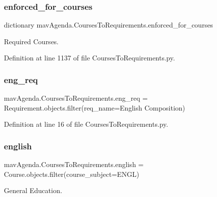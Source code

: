 \subsubsection{\texorpdfstring{enforced\+\_\+for\+\_\+courses}{enforced\_for\_courses}}
{\footnotesize\ttfamily dictionary mav\+Agenda.\+Courses\+To\+Requirements.\+enforced\+\_\+for\+\_\+courses}



Required Courses. 



Definition at line 1137 of file Courses\+To\+Requirements.\+py.

\mbox{\label{namespacemavAgenda_1_1CoursesToRequirements_a9c2b2fe8d45b47b61c06ecfc704c4b95}} 
\subsubsection{\texorpdfstring{eng\+\_\+req}{eng\_req}}
{\footnotesize\ttfamily mav\+Agenda.\+Courses\+To\+Requirements.\+eng\+\_\+req = Requirement.\+objects.\+filter(req\+\_\+name=\textquotesingle{}English Composition\textquotesingle{})}



Definition at line 16 of file Courses\+To\+Requirements.\+py.

\mbox{\label{namespacemavAgenda_1_1CoursesToRequirements_ac47922c7a0e06cded34bb418cb06b47f}} 
\subsubsection{\texorpdfstring{english}{english}}
{\footnotesize\ttfamily mav\+Agenda.\+Courses\+To\+Requirements.\+english = Course.\+objects.\+filter(course\+\_\+subject=\textquotesingle{}E\+N\+GL\textquotesingle{})}



General Education. 



